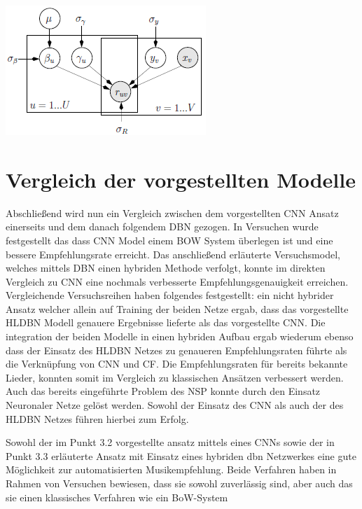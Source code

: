 \documentclass[twosided,a4,10pt]{article}
\begin{document}
\begin{multicols}{2}
		\begin{minipage}{0.45\textwidth}
			\centering
			\includegraphics{img/hybrid.png}
			\label{img:hybrid}
		\end{minipage}
		
		\section{Vergleich der vorgestellten Modelle}
		Abschließend wird nun ein Vergleich zwischen dem vorgestellten CNN Ansatz einerseits und dem danach folgendem DBN gezogen. In Versuchen \cite{oord} wurde festgestellt das dass CNN Model einem BOW System überlegen ist und eine bessere Empfehlungsrate erreicht. Das anschließend erläuterte  Versuchsmodel, welches mittels DBN einen hybriden Methode verfolgt, konnte im direkten Vergleich zu CNN eine nochmals verbesserte Empfehlungsgenauigkeit erreichen. Vergleichende Versuchsreihen \cite{wang} haben folgendes festgestellt: ein nicht hybrider Ansatz welcher allein auf Training der beiden Netze ergab, dass das vorgestellte HLDBN Modell genauere Ergebnisse lieferte als das vorgestellte CNN. Die integration der beiden Modelle in einen hybriden Aufbau ergab wiederum ebenso dass der Einsatz des HLDBN Netzes zu genaueren Empfehlungsraten führte als die Verknüpfung von CNN und CF. Die Empfehlungsraten für bereits bekannte Lieder, konnten somit im Vergleich zu klassischen Ansätzen verbessert werden. Auch das bereits eingeführte Problem des NSP konnte durch den Einsatz Neuronaler Netze gelöst werden.  Sowohl der Einsatz des CNN als auch der des HLDBN Netzes führen hierbei zum Erfolg.
		
		
		
		Sowohl der im Punkt 3.2 vorgestellte ansatz mittels eines CNNs sowie der in Punkt 3.3 erläuterte Ansatz mit Einsatz eines hybriden dbn Netzwerkes eine gute Möglichkeit zur automatisierten Musikempfehlung. Beide Verfahren haben in Rahmen von Versuchen bewiesen, dass sie sowohl zuverlässig sind, aber auch das sie einen klassisches Verfahren wie ein BoW-System 
		
		
		
		
	\end{multicols}
	
\end{document}
